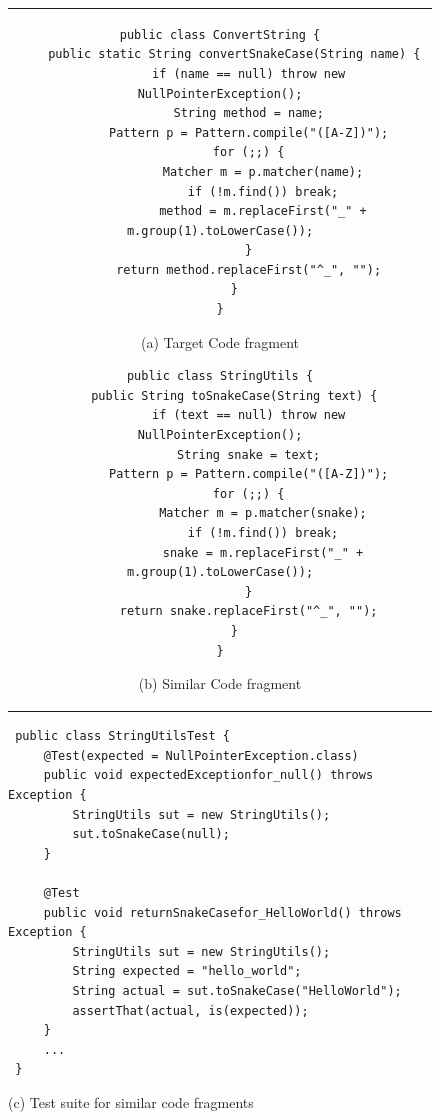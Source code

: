 \documentclass[conference]{IEEEtran}
\begin{document}
\begin{figure}[t]
\begin{center}
  \begin{tabular}{c}

    \begin{minipage}{0.5\hsize}
      \begin{center}
\begin{lstlisting}
public class ConvertString {
    public static String convertSnakeCase(String name) {
        if (name == null) throw new NullPointerException();
        String method = name;
        Pattern p = Pattern.compile("([A-Z])");
        for (;;) {
            Matcher m = p.matcher(name);
            if (!m.find()) break;
            method = m.replaceFirst("_" + m.group(1).toLowerCase());
        }
        return method.replaceFirst("^_", "");
    }
}
\end{lstlisting}
{\scriptsize (a) Target Code fragment}
\end{center}
\end{minipage}

    \begin{minipage}{0.5\hsize}
      \begin{center}
\begin{lstlisting}
public class StringUtils {
    public String toSnakeCase(String text) {
        if (text == null) throw new NullPointerException();
        String snake = text;
        Pattern p = Pattern.compile("([A-Z])");
        for (;;) {
            Matcher m = p.matcher(snake);
            if (!m.find()) break;
            snake = m.replaceFirst("_" + m.group(1).toLowerCase());
        }
        return snake.replaceFirst("^_", "");
    }
}
\end{lstlisting}
{\scriptsize (b) Similar Code fragment}
      \end{center}
    \end{minipage}
  \end{tabular}
  \end{center}
\end{figure}

\begin{figure}[htbp]
\begin{center}
\begin{lstlisting}
 public class StringUtilsTest {
     @Test(expected = NullPointerException.class)
     public void expectedExceptionfor_null() throws Exception {
    	 StringUtils sut = new StringUtils();
    	 sut.toSnakeCase(null);
     }
    
     @Test
     public void returnSnakeCasefor_HelloWorld() throws Exception {
     	 StringUtils sut = new StringUtils();
    	 String expected = "hello_world";
    	 String actual = sut.toSnakeCase("HelloWorld");
         assertThat(actual, is(expected));
     }
     ...
 }
\end{lstlisting}
{\scriptsize (c) Test suite for similar code fragments}
\end{center}
\end{figure}
\end{document}
